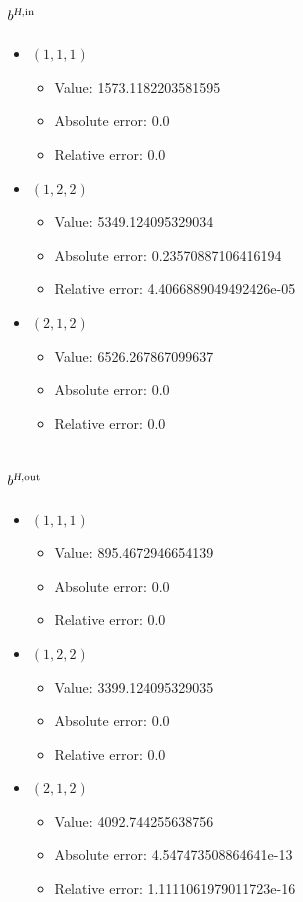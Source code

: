 \documentclass{article}%
\begin{document}
\subsection{$b^{\textsl{H},\text{in}}$}%
\begin{itemize}%
	\item $(1, 1, 1)$%
	\begin{itemize}%
		\item Value: 1573.1182203581595%
		\item Absolute error: 0.0%
		\item Relative error: 0.0%
	\end{itemize}%
	\item $(1, 2, 2)$%
	\begin{itemize}%
		\item Value: 5349.124095329034%
		\item Absolute error: 0.23570887106416194%
		\item Relative error: 4.4066889049492426e-05%
	\end{itemize}%
	\item $(2, 1, 2)$%
	\begin{itemize}%
		\item Value: 6526.267867099637%
		\item Absolute error: 0.0%
		\item Relative error: 0.0%
	\end{itemize}%
\end{itemize}%
\subsection{$b^{\textsl{H},\text{out}}$}%
\begin{itemize}%
	\item $(1, 1, 1)$%
	\begin{itemize}%
		\item Value: 895.4672946654139%
		\item Absolute error: 0.0%
		\item Relative error: 0.0%
	\end{itemize}%
	\item $(1, 2, 2)$%
	\begin{itemize}%
		\item Value: 3399.124095329035%
		\item Absolute error: 0.0%
		\item Relative error: 0.0%
	\end{itemize}%
	\item $(2, 1, 2)$%
	\begin{itemize}%
		\item Value: 4092.744255638756%
		\item Absolute error: 4.547473508864641e-13%
		\item Relative error: 1.1111061979011723e-16%
	\end{itemize}%
\end{itemize}%
\end{document}
